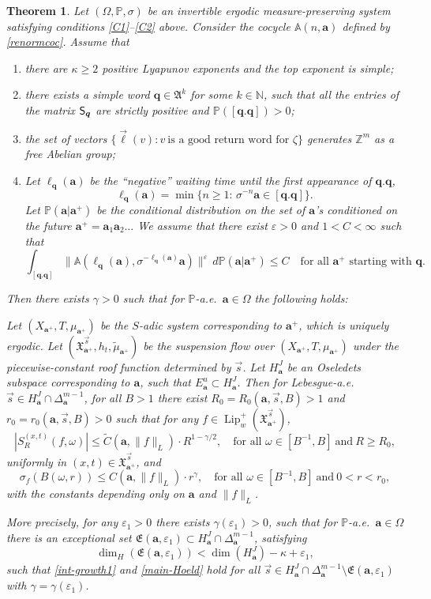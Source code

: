 \documentclass[JEP,XML,SOM,Unicode]{cedram}
\newenvironment{enumeratea}
{\bgroup\def\theenumi{\alph{enumi}}\begin{enumerate}}
{\end{enumerate}\egroup}
\newcommand{\sep}{:}
\let\epsilon\varepsilon
\theoremstyle{plain}
\newtheorem{theorem}{Theorem}[section]
\theoremstyle{definition}
\let\wt\widetilde
\DeclareMathOperator{\Lip}{Lip}
\newcommand\bom{{\boldsymbol a}}\let\ba\bom
\newcommand \q {{\boldsymbol q}}
\newcommand\bq{{\boldsymbol q}}
\newcommand\bqcyl{[\bq.\bq]}
\let\eps\varepsilon
\let\gam\gamma
\let\om\omega
\let\Om\Omega
\let\sig\sigma
\newcommand\FrA{\mathfrak{A}}
\newcommand\Fre{\mathfrak{E}}
\newcommand\Xx{\mathfrak{X}}
\newcommand\Aa{\mathbb{A}}
\newcommand{\Z}{\mathbb{Z}}
\newcommand{\N}{\mathbb{N}}
\renewcommand{\P}{\mathbb{P}}
\newcommand\Sf{{\sf S}}
\newcommand\be{\begin{equation}}
\newcommand\ee{\end{equation}}
\begin{document}
\begin{theorem} \label{th-main1}
Let $(\Om,\P,\sig)$ be an invertible ergodic measure-preserving system satisfying conditions \eqref{C1}--\eqref{C2} above. Consider the cocycle $\Aa(n,\bom)$ defined by \eqref{renormcoc}. Assume that
\begin{enumeratea}
\item\label{th-main1a}
there are $\kappa\ge 2$ positive Lyapunov exponents
and the top exponent is simple;
\item\label{th-main1b} there exists a simple word $\bq\in \FrA^k$ for some $k\in \N$, such that all the entries of the matrix $\Sf_\bq$ are strictly positive and $\P(\bqcyl)>0$;
\item\label{th-main1c}
the set of vectors $\{\vec\ell(v)\sep v\ \text{is a good
return word for $\zeta$}\}$ generates $\Z^m$ as a free Abelian group;
\item\label{th-main1d}
Let $\ell_\bq(\bom)$ be the ``negative'' waiting time until the first appearance of $\bq.\bq$, \ie
\[
\ell_\bq(\bom) = \min\{n\ge 1:\, \sig^{-n}\bom \in \bqcyl\}.
\]
Let $\P(\bom|\bom^+)$ be the conditional distribution on the set of $\bom$'s
conditioned on the future $\bom^+ = \bom_1\bom_2\ldots$ We assume that there exist $\eps>0$ and $1<C<\infty$ such that
\be \label{eq-star1}
\int_{\bqcyl} \bigl\|\Aa(\ell_\bq(\bom), \sig^{-\ell_\bq(\bom)}\bom)\bigr\|^\eps\,d\P(\bom|\bom^+) \le C\quad \text{for all $\bom^+$ starting with $\q$}.
\ee
\end{enumeratea}
\noindent
Then there exists $\gam>0$ such that for $\P$-a.e.\ $\bom \in \Om$ the following holds:

Let $(X_{\bom^+},T,\mu_{\bom^+})$ be
the $S$-adic system corresponding to $\bom^+$, which is uniquely ergodic.
Let $(\Xx_{\bom^+}^{\vec{s}},h_t,\wt \mu_{\bom^+})$ be the suspension flow over $(X_{\bom^+},T,\mu_{\bom^+})$ under the piecewise-constant roof function determined by $\vec{s}$.
Let $H^J_\bom$ be an Oseledets subspace corresponding to $\bom$, such that $E^u_\bom\subset H^J_\bom$. Then
for Lebesgue-a.e.\ $\vec{s}\in H^J_\bom\cap \Delta_\bom^{m-1}$,
for all
$B>1$ there exist $R_0 = R_0(\bom,\vec s, B)>1$ and $r_0=r_0(\bom, \vec s, B)>0$
such that for any $f\in \Lip_w^+(\Xx_{\bom^+}^{\vec{s}})$,
\be \label{int-growth1}
|S^{(x,t)}_R(f,\om)| \le \wt{C}(\bom,\|f\|_L)\cdot R^{1-\gam/2},\quad \text{for all }\om\in[B^{-1},B]\ \text{and}\ R\ge R_0,
\ee
uniformly in $(x,t)\in \Xx_{\bom^+}^{\vec{s}}$, and
\be \label{main-Hoeld}
\sig_f(B(\om,r))\le C(\bom,\|f\|_L)\cdot r^\gam,\quad \text{for all } \om\in[B^{-1},B]\ \text{and}\ 0<r< r_0,
\ee
with the constants depending only on $\bom$ and $\|f\|_L$.

More precisely, for any $\epsilon_1>0$ there exists $\gam(\epsilon_1)>0$, such that for $\P$-a.e.\ $\bom \in \Om$ there is an exceptional set $\Fre(\bom,\epsilon_1)\subset H_\bom^J\cap \Delta_\bom^{m-1}$, satisfying
\be \label{dimesta}
\dim_H(\Fre(\bom,\epsilon_1)) < \dim(H^J_\bom)-\kappa+ \epsilon_1,
\ee
such that \eqref{int-growth1} and \eqref{main-Hoeld} hold for all $\vec s\in H^J_\bom \cap \Delta_\bom^{m-1}\setminus \Fre(\bom,\eps_1)$ with $\gam = \gam(\epsilon_1)$.
\end{theorem}
\end{document}
